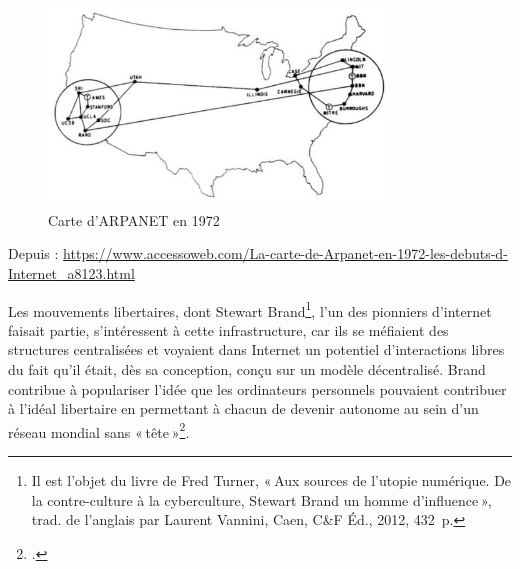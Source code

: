 \begin{figure}[h!]
	\centering
	\includegraphics[width=0.8\textwidth]{images/image24.jpg}
	\caption{Carte d’ARPANET en 1972}
	\label{fig:image24}
\end{figure}

\begin{center}
	Depuis : \url{https://www.accessoweb.com/La-carte-de-Arpanet-en-1972-les-debuts-d-Internet_a8123.html}
\end{center}


Les mouvements libertaires, dont Stewart Brand\footnote{ Il est l’objet du livre de Fred Turner, « Aux sources de l’utopie numérique. De la contre-culture à la cyberculture, Stewart Brand un homme d’influence », trad. de l’anglais par Laurent Vannini, Caen, C\&F Éd., 2012, 432 p.}, l’un des pionniers d’internet faisait partie, s’intéressent à cette infrastructure, car ils se méfiaient des structures centralisées et voyaient dans Internet un potentiel d’interactions libres du fait qu'il était, dès sa conception, conçu sur un modèle décentralisé. Brand contribue à populariser l’idée que les ordinateurs personnels pouvaient contribuer à l’idéal libertaire en permettant à chacun de devenir autonome au sein d’un réseau mondial sans « tête »\footcite[§ 5]{goeta_fred_2013}.

